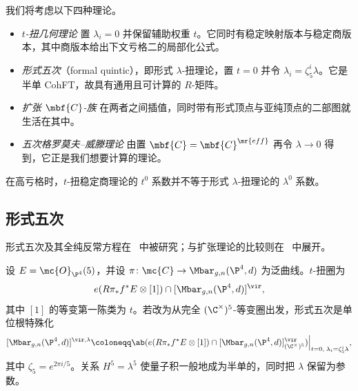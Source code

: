 我们将考虑以下四种理论。
\begin{itemize}
    \item \textit{\(t\)-扭几何理论} 置 \(\lambda_i = 0\) 并保留辅助权重 \(t\)。它同时有稳定映射版本与稳定商版本，其中商版本给出下文亏格二的局部化公式。
    \item \textit{形式五次}（formal quintic），即形式 \(\lambda\)-扭理论，置 \(t = 0\) 并令 \(\lambda_i = \zeta_5^i \lambda\)。它是半单 CohFT，故具有通用且可计算的 \(R\)-矩阵。
    \item \textit{扩张 \(\mbf{C}\)-族} 在两者之间插值，同时带有形式顶点与亚纯顶点的二部图就生活在其中。
    \item \textit{五次格罗莫夫–威滕理论} 由置 \(\mbf{C} = \mbf{C}^{\mr{eff}}\) 再令 \(\lambda \to 0\) 得到，它正是我们想要计算的理论。
\end{itemize}

\begin{warn}
    在高亏格时，\(t\)-扭稳定商理论的 \(t^0\) 系数并不等于形式 \(\lambda\)-扭理论的 \(\lambda^0\) 系数。
\end{warn}

\subsection{形式五次}%
\label{sub:The formal quintic}

形式五次及其全纯反常方程在~\cite{LhoPandharipande2019} 中被研究；与扩张理论的比较则在~\cite{GJRstructure} 中展开。

设 \(E = \mc{O}_{\P^4}(5)\)，并设 \(\pi \colon \mc{C} \to \Mbar_{g,n}(\P^4,d)\) 为泛曲线。\(t\)-扭圈为
\[ e(R\pi_* f^* E \otimes [1]) \cap [\Mbar_{g,n}(\P^4,d)]^{\vir}, \]
其中 \([1]\) 的等变第一陈类为 \(t\)。若改为从完全 \((\C^{\times})^5\)-等变圈出发，形式五次是单位根特殊化
\[ [\Mbar_{g,n}(\P^4,d)]^{\vir,\lambda} \coloneqq \ab( e(R\pi_*f^*E \otimes [1]) \cap [\Mbar_{g,n}(\P^4,d)]^{\vir}_{(\C^{\times})^5})\Big|_{t=0, \; \lambda_i = \zeta_5^i \lambda}, \]
其中 \(\zeta_5 = e^{2\pi i/5}\)。关系 \(H^5 = \lambda^5\) 使量子积一般地成为半单的，同时把 \(\lambda\) 保留为参数。

